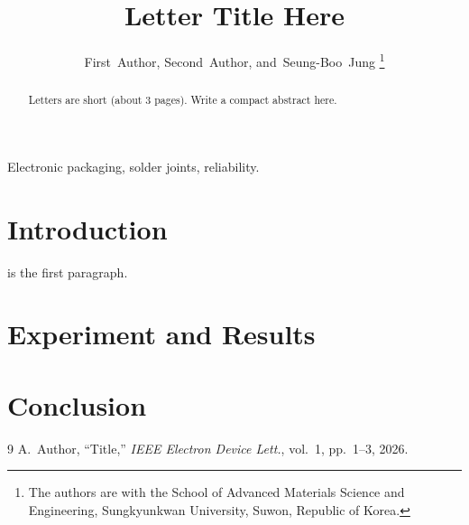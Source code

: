 \documentclass[journal]{IEEEtran}
\begin{document}
\title{Letter Title Here}

\author{First~Author,
        Second~Author,
        and~Seung-Boo~Jung%
\thanks{The authors are with the School of Advanced Materials Science and
Engineering, Sungkyunkwan University, Suwon, Republic of Korea.}}

\maketitle

\begin{abstract}
Letters are short (about 3 pages). Write a compact abstract here.
\end{abstract}

\begin{IEEEkeywords}
Electronic packaging, solder joints, reliability.
\end{IEEEkeywords}

\section{Introduction}
 is the first paragraph.

\section{Experiment and Results}

\section{Conclusion}

\begin{thebibliography}{9}
 A.~Author, ``Title,'' \emph{IEEE Electron Device Lett.}, vol.~1, pp.~1--3, 2026.
\end{thebibliography}
\end{document}
